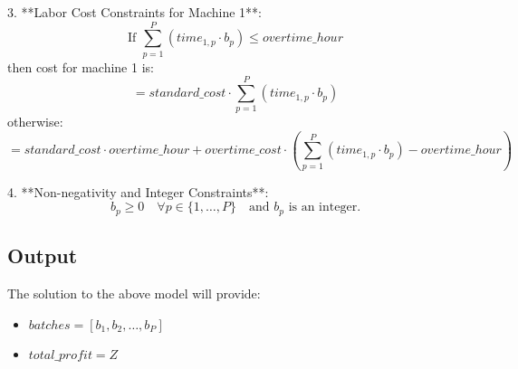\documentclass{article}
\begin{document}
3. **Labor Cost Constraints for Machine 1**:
   \[
   \text{If } \sum_{p=1}^{P} (time_{1,p} \cdot b_p) \leq overtime\_hour 
   \]
   then cost for machine 1 is:
   \[
   = standard\_cost \cdot \sum_{p=1}^{P} (time_{1,p} \cdot b_p)
   \]
   otherwise:
   \[
   = standard\_cost \cdot overtime\_hour + overtime\_cost \cdot \left(\sum_{p=1}^{P} (time_{1,p} \cdot b_p) - overtime\_hour\right)
   \]

4. **Non-negativity and Integer Constraints**:
   \[
   b_p \geq 0 \quad \forall p \in \{1, \ldots, P\} \quad \text{and } b_p \text{ is an integer.}
   \]

\subsection*{Output}
The solution to the above model will provide:
\begin{itemize}
    \item \( batches = [b_1, b_2, \ldots, b_P] \)
    \item \( total\_profit = Z \)
\end{itemize}
\end{document}
